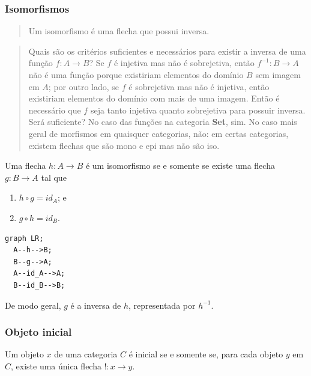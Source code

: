 \hypertarget{isomorfismos}{%
\subsubsection{Isomorfismos}\label{isomorfismos}}

\begin{quote}
Um isomorfismo é uma flecha que possui inversa.
\end{quote}

\begin{quote}
Quais são os critérios suficientes e necessários para existir a inversa
de uma função \(f : A \rightarrow B\)? Se \(f\) é injetiva mas não é
sobrejetiva, então \(f^{-1} : B \rightarrow A\) não é uma função porque
existiriam elementos do domínio \(B\) sem imagem em \(A\); por outro
lado, se \(f\) é sobrejetiva mas não é injetiva, então existiriam
elementos do domínio com mais de uma imagem. Então é necessário que
\(f\) seja tanto injetiva quanto sobrejetiva para possuir inversa. Será
suficiente? No caso das funções na categoria \textbf{Set}, sim. No caso
mais geral de morfismos em quaisquer categorias, não: em certas
categorias, existem flechas que são mono e epi mas não são iso.
\end{quote}

Uma flecha \(h : A \rightarrow B\) é um isomorfismo se e somente se
existe uma flecha \(g : B \rightarrow A\) tal que

\begin{enumerate}
\def\labelenumi{\arabic{enumi}.}
\tightlist
\item
  \(h \circ g = id_A\); e
\item
  \(g \circ h = id_B\).
\end{enumerate}

\begin{verbatim}
graph LR;
  A--h-->B;
  B--g-->A;
  A--id_A-->A;
  B--id_B-->B;
\end{verbatim}

De modo geral, \(g\) é a inversa de \(h\), representada por \(h^{-1}\).

\hypertarget{objeto-inicial}{%
\subsubsection{Objeto inicial}\label{objeto-inicial}}

Um objeto \(x\) de uma categoria \(C\) é inicial se e somente se, para
cada objeto \(y\) em \(C\), existe uma única flecha
\(! : x \rightarrow y\).

